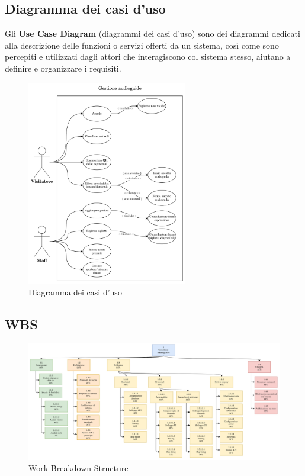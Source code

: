 \documentclass[12pt]{article}
\begin{document}
\clearpage

\subsection{Diagramma dei casi d'uso}
Gli \textbf{Use Case Diagram} (diagrammi dei casi d'uso) sono dei diagrammi dedicati alla descrizione delle funzioni o servizi offerti da un sistema, così come sono percepiti e utilizzati dagli attori che interagiscono col sistema stesso, aiutano a definire e organizzare i requisiti.
\begin{center}
    \begin{figure}[htp]
        \centering
        \includegraphics[width=7cm]{diagrams/usecase_diagrams.png}
        \caption{Diagramma dei casi d'uso}
        \label{fig:usecase}
    \end{figure}
\end{center}

\subsection{WBS}
\begin{center}
    \begin{figure}[htp]
        \centering
        \includegraphics[width=14cm]{diagrams/wbs_v2.png}
        \caption{Work Breakdown Structure}
        \label{fig:wbs}
    \end{figure}
\end{center}
\clearpage
\end{document}

